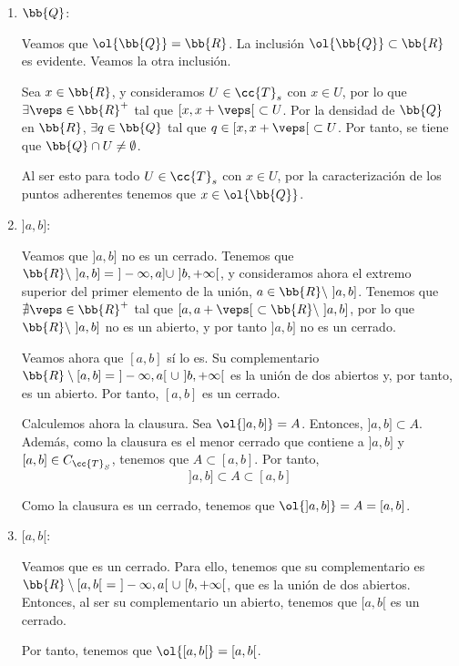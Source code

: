 \begin{ejercicio}
\begin{enumerate}
        \item $\bb{Q}$:

        Veamos que $\ol{\bb{Q}}=\bb{R}$. La inclusión $\ol{\bb{Q}}\subset \bb{R}$ es evidente. Veamos la otra inclusión.

        Sea $x\in \bb{R}$, y consideramos $U\in \cc{T}_s$ con $x\in U$, por lo que $\exists \veps\in \bb{R}^+$ tal que $[x,x+\veps[~\subset U$. Por la densidad de $\bb{Q}$ en $\bb{R}$, $\exists q\in \bb{Q}$ tal que $q\in [x,x+\veps[~\subset U$. Por tanto, se tiene que $\bb{Q}\cap U\neq \emptyset$.
        
        Al ser esto para todo $U\in \cc{T}_s$ con $x\in U$, por la caracterización de los puntos adherentes tenemos que $x\in \ol{\bb{Q}}$.
        
        \item $]a,b]$:

        Veamos que $]a,b]$ no es un cerrado. Tenemos que $\bb{R}\setminus~]a,b]=~]-\infty, a]\cup ~]b,+\infty[$, y consideramos ahora el extremo superior del primer elemento de la unión, $a\in \bb{R}\setminus~]a,b]$. Tenemos que $\nexists \veps\in \bb{R}^+$ tal que $[a,a+\veps[~\subset \bb{R}\setminus~]a,b]$, por lo que $\bb{R}\setminus~]a,b]$ no es un abierto, y por tanto $]a,b]$ no es un cerrado.

        Veamos ahora que $[a,b]$ sí lo es. Su complementario $\bb{R}\setminus [a,b]=~]-\infty, a[~\cup ~]b,+\infty[$ es la unión de dos abiertos y, por tanto, es un abierto. Por tanto, $[a,b]$ es un cerrado.

        Calculemos ahora la clausura. Sea $\ol{]a,b]}=A$. Entonces, $]a,b]\subset A$. Además, como la clausura es el menor cerrado que contiene a $]a,b]$ y $[a,b]\in C_{\cc{T}_S}$, tenemos que $A\subset [a,b]$. Por tanto,
        \begin{equation*}
            ]a,b]\subset A\subset [a,b]
        \end{equation*}

        Como la clausura es un cerrado, tenemos que $\ol{]a,b]}=A=[a,b]$.
        
        \item $[a,b[$:

        Veamos que es un cerrado. Para ello, tenemos que su complementario es $\bb{R}\setminus [a,b[~=~]-\infty, a[~\cup~[b,+\infty[$, que es la unión de dos abiertos. Entonces, al ser su complementario un abierto, tenemos que $[a,b[$ es un cerrado.

        Por tanto, tenemos que $\ol{[a,b[}=[a,b[$.
        

\end{enumerate}
\end{ejercicio}
